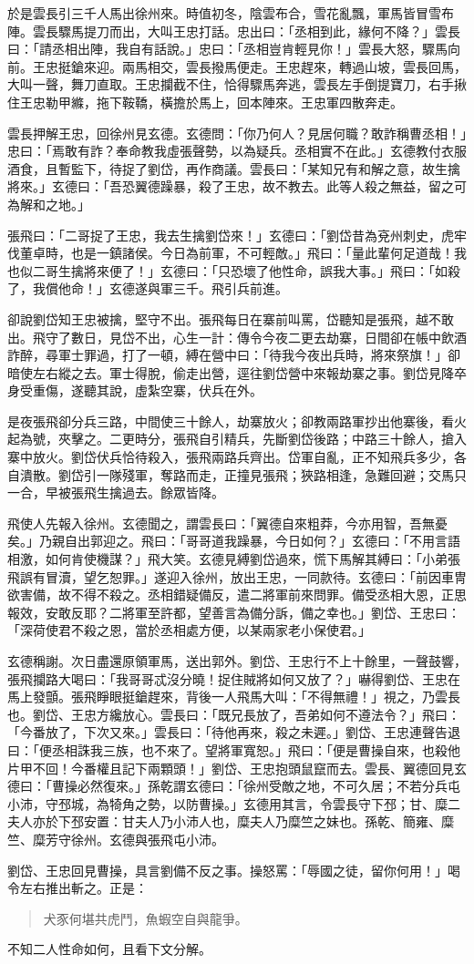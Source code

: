 於是雲長引三千人馬出徐州來。時值初冬，陰雲布合，雪花亂飄，軍馬皆冒雪布陣。雲長驟馬提刀而出，大叫王忠打話。忠出曰：「丞相到此，緣何不降？」雲長曰：「請丞相出陣，我自有話說。」忠曰：「丞相豈肯輕見你！」雲長大怒，驟馬向前。王忠挺鎗來迎。兩馬相交，雲長撥馬便走。王忠趕來，轉過山坡，雲長回馬，大叫一聲，舞刀直取。王忠攔截不住，恰得驟馬奔逃，雲長左手倒提寶刀，右手揪住王忠勒甲縧，拖下鞍鞽，橫擔於馬上，回本陣來。王忠軍四散奔走。

雲長押解王忠，回徐州見玄德。玄德問：「你乃何人？見居何職？敢詐稱曹丞相！」忠曰：「焉敢有詐？奉命教我虛張聲勢，以為疑兵。丞相實不在此。」玄德教付衣服酒食，且暫監下，待捉了劉岱，再作商議。雲長曰：「某知兄有和解之意，故生擒將來。」玄德曰：「吾恐翼德躁暴，殺了王忠，故不教去。此等人殺之無益，留之可為解和之地。」

張飛曰：「二哥捉了王忠，我去生擒劉岱來！」玄德曰：「劉岱昔為兗州刺史，虎牢伐董卓時，也是一鎮諸侯。今日為前軍，不可輕敵。」飛曰：「量此輩何足道哉！我也似二哥生擒將來便了！」玄德曰：「只恐壞了他性命，誤我大事。」飛曰：「如殺了，我償他命！」玄德遂與軍三千。飛引兵前進。

卻說劉岱知王忠被擒，堅守不出。張飛每日在寨前叫罵，岱聽知是張飛，越不敢出。飛守了數日，見岱不出，心生一計：傳令今夜二更去劫寨，日間卻在帳中飲酒詐醉，尋軍士罪過，打了一頓，縛在營中曰：「待我今夜出兵時，將來祭旗！」卻暗使左右縱之去。軍士得脫，偷走出營，逕往劉岱營中來報劫寨之事。劉岱見降卒身受重傷，遂聽其說，虛紮空寨，伏兵在外。

是夜張飛卻分兵三路，中間使三十餘人，劫寨放火；卻教兩路軍抄出他寨後，看火起為號，夾擊之。二更時分，張飛自引精兵，先斷劉岱後路；中路三十餘人，搶入寨中放火。劉岱伏兵恰待殺入，張飛兩路兵齊出。岱軍自亂，正不知飛兵多少，各自潰散。劉岱引一隊殘軍，奪路而走，正撞見張飛；狹路相逢，急難回避；交馬只一合，早被張飛生擒過去。餘眾皆降。

飛使人先報入徐州。玄德聞之，謂雲長曰：「翼德自來粗莽，今亦用智，吾無憂矣。」乃親自出郭迎之。飛曰：「哥哥道我躁暴，今日如何？」玄德曰：「不用言語相激，如何肯使機謀？」飛大笑。玄德見縛劉岱過來，慌下馬解其縛曰：「小弟張飛誤有冒瀆，望乞恕罪。」遂迎入徐州，放出王忠，一同款待。玄德曰：「前因車冑欲害備，故不得不殺之。丞相錯疑備反，遣二將軍前來問罪。備受丞相大恩，正思報效，安敢反耶？二將軍至許都，望善言為備分訴，備之幸也。」劉岱、王忠曰：「深荷使君不殺之恩，當於丞相處方便，以某兩家老小保使君。」

玄德稱謝。次日盡還原領軍馬，送出郭外。劉岱、王忠行不上十餘里，一聲鼓響，張飛攔路大喝曰：「我哥哥忒沒分曉！捉住賊將如何又放了？」嚇得劉岱、王忠在馬上發顫。張飛睜眼挺鎗趕來，背後一人飛馬大叫：「不得無禮！」視之，乃雲長也。劉岱、王忠方纔放心。雲長曰：「既兄長放了，吾弟如何不遵法令？」飛曰：「今番放了，下次又來。」雲長曰：「待他再來，殺之未遲。」劉岱、王忠連聲告退曰：「便丞相誅我三族，也不來了。望將軍寬恕。」飛曰：「便是曹操自來，也殺他片甲不回！今番權且記下兩顆頭！」劉岱、王忠抱頭鼠竄而去。雲長、翼德回見玄德曰：「曹操必然復來。」孫乾謂玄德曰：「徐州受敵之地，不可久居；不若分兵屯小沛，守邳城，為犄角之勢，以防曹操。」玄德用其言，令雲長守下邳；甘、糜二夫人亦於下邳安置：甘夫人乃小沛人也，糜夫人乃糜竺之妹也。孫乾、簡雍、糜竺、糜芳守徐州。玄德與張飛屯小沛。

劉岱、王忠回見曹操，具言劉備不反之事。操怒罵：「辱國之徒，留你何用！」喝令左右推出斬之。正是：

\begin{quote}
犬豕何堪共虎鬥，魚蝦空自與龍爭。
\end{quote}

不知二人性命如何，且看下文分解。
